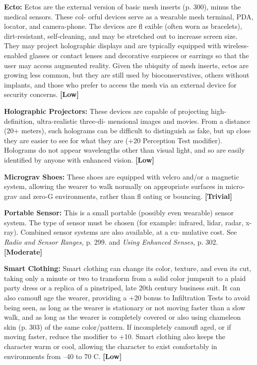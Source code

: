 \textbf{Ecto:} Ectos are the external version of basic mesh 
inserts (p. 300), minus the medical sensors. These col-
orful devices serve as a wearable mesh terminal, PDA, 
locator, and camera-phone. The devices are fl exible 
(often worn as bracelets), dirt-resistant, self-cleaning, 
and may be stretched out to increase screen size. They 
may project holographic displays and are typically 
equipped with wireless-enabled glasses or contact 
lenses and decorative earpieces or earrings so that the 
user may access augmented reality. Given the ubiquity 
of mesh inserts, ectos are growing less common, but 
they are still used by bioconservatives, others without 
implants, and those who prefer to access the mesh via 
an external device for security concerns. \textbf{[Low]}

\textbf{Holographic Projectors: }These devices are capable 
of projecting high-definition, ultra-realistic three-di-
mensional images and movies. From a distance (20+ 
meters), such holograms can be difficult to distinguish 
as fake, but up close they are easier to see for what they 
are (+20 Perception Test modifier). Holograms do not 
appear wavelengths other than visual light, and so are 
easily identified by anyone with enhanced vision. \textbf{[Low]}

\textbf{Micrograv Shoes:} These shoes are equipped with 
velcro and/or a magnetic system, allowing the wearer 
to walk normally on appropriate surfaces in micro-
grav and zero-G environments, rather than fl oating or 
bouncing. \textbf{[Trivial]}

\textbf{Portable Sensor:} This is a small portable (possibly 
even wearable) sensor system. The type of sensor must 
be chosen (for example: infrared, lidar, radar, x-ray). 
Combined sensor systems are also available, at a cu-
mulative cost. See \textit{Radio and Sensor Ranges,} p. 299. 
and \textit{Using Enhanced Senses,} p. 302. \textbf{[Moderate]}

\textbf{Smart Clothing: }Smart clothing can change its 
color, texture, and even its cut, taking only a minute 
or two to transform from a solid color jumpsuit to a 
plaid party dress or a replica of a pinstriped, late 20th 
century business suit. It can also camoufl age the wearer, 
providing a +20 bonus to Infiltration Tests to avoid 
being seen, as long as the wearer is stationary or not 
moving faster than a slow walk, and as long as the 
wearer is completely covered or also using chameleon 
skin (p. 303) of the same color/pattern. If incompletely 
camoufl aged, or if moving faster, reduce the modifier 
to +10. Smart clothing also keeps the character warm 
or cool, allowing the character to exist comfortably in 
environments from –40 to 70 C. \textbf{[Low]}

